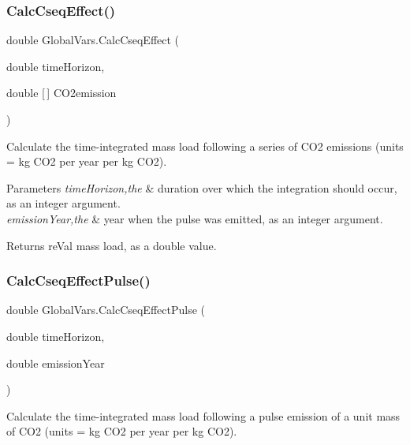 \subsubsection{\texorpdfstring{CalcCseqEffect()}{CalcCseqEffect()}}
{\footnotesize\ttfamily double Global\+Vars.\+Calc\+Cseq\+Effect (\begin{DoxyParamCaption}\item[{double}]{time\+Horizon,  }\item[{double \mbox{[}$\,$\mbox{]}}]{C\+O2emission }\end{DoxyParamCaption})\hspace{0.3cm}{\ttfamily [inline]}}



Calculate the time-\/integrated mass load following a series of C\+O2 emissions (units = kg C\+O2 per year per kg C\+O2). 


\begin{DoxyParams}{Parameters}
{\em time\+Horizon,the} & duration over which the integration should occur, as an integer argument. \\
\hline
{\em emission\+Year,the} & year when the pulse was emitted, as an integer argument. \\
\hline
\end{DoxyParams}
\begin{DoxyReturn}{Returns}
re\+Val mass load, as a double value. 
\end{DoxyReturn}
\mbox{\label{class_global_vars_a04a94dd0bc66a17669168de6a5dee129}} 
\subsubsection{\texorpdfstring{CalcCseqEffectPulse()}{CalcCseqEffectPulse()}}
{\footnotesize\ttfamily double Global\+Vars.\+Calc\+Cseq\+Effect\+Pulse (\begin{DoxyParamCaption}\item[{double}]{time\+Horizon,  }\item[{double}]{emission\+Year }\end{DoxyParamCaption})\hspace{0.3cm}{\ttfamily [inline]}}



Calculate the time-\/integrated mass load following a pulse emission of a unit mass of C\+O2 (units = kg C\+O2 per year per kg C\+O2). 



